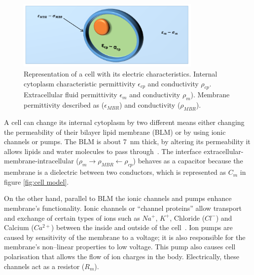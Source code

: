 \begin{figure}[!htpb]
	\centering
	\includegraphics[width=0.8\textwidth,keepaspectratio, trim={0cm 0cm 0cm 0cm},clip]{figure1}    
	\caption[Cell permeability and conductivity distribution]{Representation of a cell with its electric characteristics. Internal cytoplasm characteristic permittivity $\epsilon_{cp}$ and conductivity $\rho_{cp}$. Extracellular fluid permittivity $\epsilon_m$ and conductivity $\rho_m$). Membrane permittivity described as ($\epsilon_{MBR}$) and conductivity ($\rho_{MBR}$).}
	\label{fig:cell}
\end{figure}

A cell can change its internal cytoplasm by two different means either changing the permeability of their bilayer lipid membrane (BLM) or by using ionic channels or pumps. The BLM is about \SI{7}{\nano\meter} thick, by altering its permeability it allows lipids and water molecules to pass through~\cite{ivorra2003bioimpedance}. The interface extracellular-membrane-intracellular ($\rho_m \rightarrow \rho_{MBR} \leftarrow \rho_{cp}$) behaves as a capacitor because the membrane is a dielectric between two conductors, which is represented as $C_m$ in figure \ref{fig:cell model}.

On the other hand, parallel to BLM the ionic channels and pumps enhance membrane’s functionality. Ionic channels or “channel proteins” allow transport and exchange of certain types of ions such as $Na^{+}$, $K^{+}$, Chloride ($Cl^{-}$) and Calcium ($Ca^{2+}$) between the inside and outside of the cell~\cite{lvovich2012impedance}. Ion pumps are caused by sensitivity of the membrane to a voltage; it is also responsible for the membrane’s non–linear properties to low voltage. This pump also causes cell polarisation that allows the flow of ion charges in the body. Electrically, these channels act as a resistor ($R_m$).

